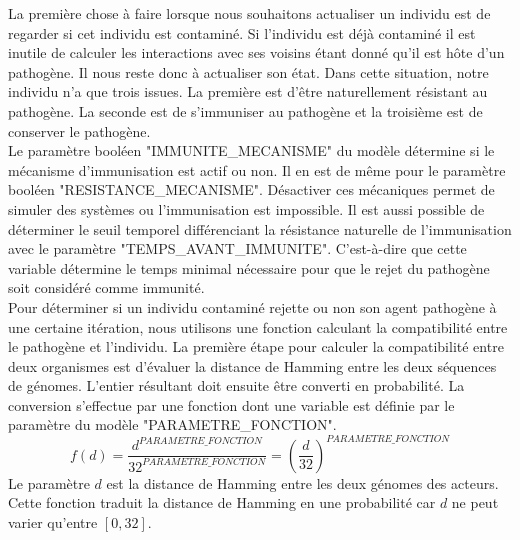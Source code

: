 La première chose à faire lorsque nous souhaitons actualiser un individu est de regarder si cet individu est contaminé. Si l'individu est déjà contaminé il est inutile de calculer les interactions avec ses voisins étant donné qu'il est hôte d'un pathogène. Il nous reste donc à actualiser son état. Dans cette situation, notre individu n'a que trois issues. La première est d'être naturellement résistant au pathogène. La seconde est de s'immuniser au pathogène et la troisième est de conserver le pathogène.\\

Le paramètre booléen {\small "IMMUNITE\_MECANISME"} du modèle détermine si le mécanisme d'immunisation est actif ou non. Il en est de même pour le paramètre booléen {\small "RESISTANCE\_MECANISME"}. Désactiver ces mécaniques permet de simuler des systèmes ou l'immunisation est impossible. Il est aussi possible de déterminer le seuil temporel différenciant la résistance naturelle de l'immunisation avec le paramètre {\small "TEMPS\_AVANT\_IMMUNITE"}. C'est-à-dire que cette variable détermine le temps minimal nécessaire pour que le rejet du pathogène soit considéré comme immunité.\\

Pour déterminer si un individu contaminé rejette ou non son agent pathogène à une certaine itération, nous utilisons une fonction calculant la compatibilité entre le pathogène et l'individu. La première étape pour calculer la compatibilité entre deux organismes est d'évaluer la distance de Hamming entre les deux séquences de génomes. L'entier résultant doit ensuite être converti en probabilité. La conversion s'effectue par une fonction dont une variable est définie par le paramètre du modèle {\small "PARAMETRE\_FONCTION"}.\\
$$
f(d) = \frac{d^{PARAMETRE\_FONCTION}}{32^{PARAMETRE\_FONCTION}} = (\frac{d}{32})^{PARAMETRE\_FONCTION}
$$
Le paramètre $d$ est la distance de Hamming entre les deux génomes des acteurs. Cette fonction traduit la distance de Hamming en une probabilité car $d$ ne peut varier qu'entre $[0,32]$.

